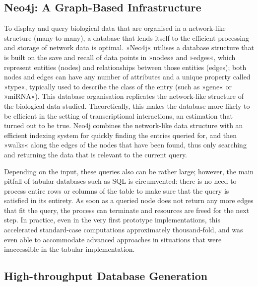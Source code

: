 \subsection{Neo4j: A Graph-Based Infrastructure}
To display and query biological data that are organised in a network-like structure (many-to-many), a database that lends itself to the efficient processing and storage of network data is optimal. »Neo4j« utilises a database structure that is built on the save and recall of data points in »nodes« and »edges«, which represent entities (nodes) and relationships between those entities (edges); both nodes and edges can have any number of attributes and a unique property called »type«, typically used to describe the class of the entry (such as »gene« or »miRNA«). This database organisation replicates the network-like structure of the biological data studied. Theoretically, this makes the database more likely to be efficient in the setting of transcriptional interactions, an estimation that turned out to be true. Neo4j combines the network-like data structure with an efficient indexing system for quickly finding the entries queried for, and then »walks« along the edges of the nodes that have been found, thus only searching and returning the data that is relevant to the current query.


Depending on the input, these queries also can be rather large; however, the main pitfall of tabular databases such as SQL is circumvented: there is no need to process entire rows or columns of the table to make sure that the query is satisfied in its entirety. As soon as a queried node does not return any more edges that fit the query, the process can terminate and resources are freed for the next step. In practice, even in the very first prototype implementations, this accelerated standard-case computations approximately thousand-fold, and was even able to accommodate advanced approaches in situations that were inaccessible in the tabular implementation.

\subsection{High-throughput Database Generation}

